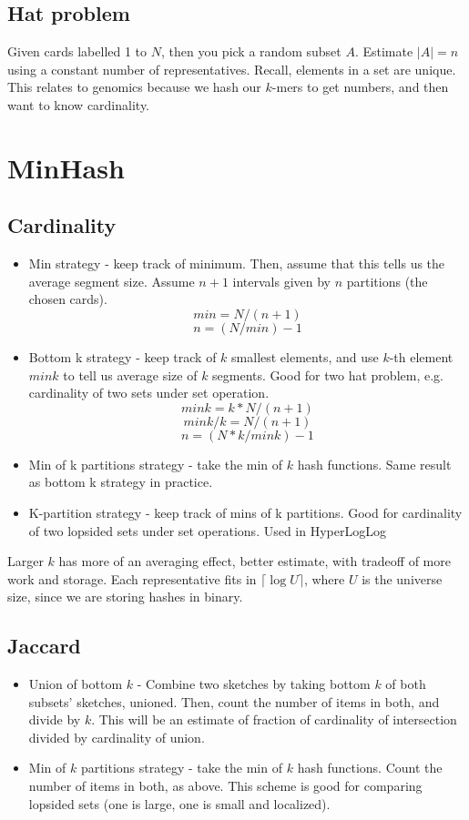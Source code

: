 \documentclass{article}
\begin{document}
\subsection*{Hat problem}
Given cards labelled 1 to $N$, then you pick a random subset $A$. Estimate $|A|=n$ using a constant number of representatives. Recall, elements in a set are unique. This relates to genomics because we hash our $k$-mers to get numbers, and then want to know cardinality.
\section*{MinHash}
\subsection*{Cardinality}
\begin{itemize}
    \item Min strategy - keep track of minimum. Then, assume that this tells us the average segment size. Assume $n+1$ intervals given by $n$ partitions (the chosen cards).
    $$min = N/(n+1)$$
    $$n = (N/min)-1$$
    \item Bottom k strategy - keep track of $k$ smallest elements, and use $k$-th element $mink$ to tell us average size of $k$ segments. Good for two hat problem, e.g. cardinality of two sets under set operation.
    $$mink = k*N/(n+1)$$
    $$mink/k = N/(n+1)$$
    $$n = (N*k/mink)-1$$
    \item Min of k partitions strategy - take the min of $k$ hash functions. Same result as bottom k strategy in practice.
    \item K-partition strategy - keep track of mins of k partitions. Good for cardinality of two lopsided sets under set operations. Used in HyperLogLog
\end{itemize}
Larger $k$ has more of an averaging effect, better estimate, with tradeoff of more work and storage. Each representative fits in $\lceil\log U\rceil$, where $U$ is the universe size, since we are storing hashes in binary.
\subsection*{Jaccard}
\begin{itemize}
    \item Union of bottom $k$ - Combine two sketches by taking bottom $k$ of both subsets' sketches, unioned. 
    Then, count the number of items in both, and divide by $k$. This will be an estimate of fraction of cardinality of intersection divided by cardinality of union.
    \item Min of $k$ partitions strategy - take the min of $k$ hash functions. Count the number of items in both, as above. This scheme is good for comparing lopsided sets (one is large, one is small and localized).
\end{itemize}{}
\end{document}
